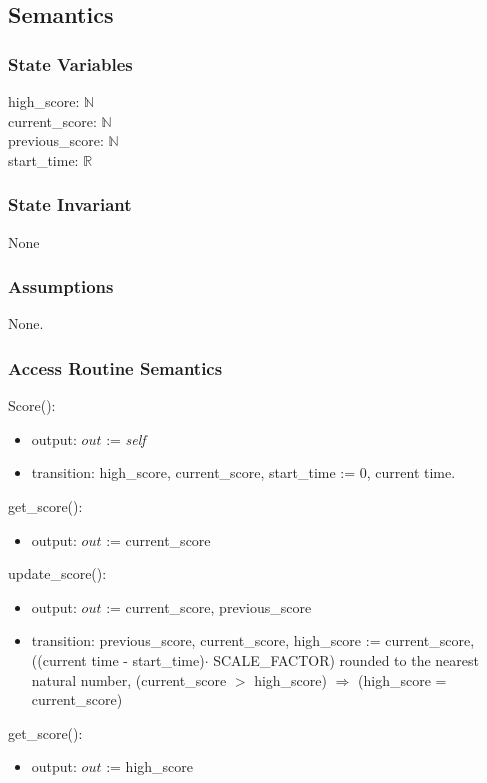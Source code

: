 \documentclass[12pt]{article}
\begin{document}
\subsection* {Semantics}

\subsubsection* {State Variables}

high\_score: $\mathbb{N}$ \\
current\_score: $\mathbb{N}$ \\
previous\_score: $\mathbb{N}$ \\
start\_time: $\mathbb{R}$

\subsubsection* {State Invariant}

None

\subsubsection* {Assumptions}

None.

\subsubsection* {Access Routine Semantics}

Score():
\begin{itemize}
    \item output: $out$ := \textit{self} 
    \item transition: high\_score, current\_score, start\_time := 0, current time.
\end{itemize}
\noindent get\_score():
\begin{itemize}
    \item output: $out$ := current\_score
\end{itemize}
\noindent update\_score():
\begin{itemize}
    \item output: $out$ := current\_score, previous\_score
    \item transition: previous\_score, current\_score, high\_score := current\_score, ((current time - start\_time)$\cdot$ SCALE\_FACTOR) rounded to the nearest natural number, (current\_score $>$ high\_score) $\Rightarrow$ (high\_score = current\_score)
\end{itemize}
\noindent get\_score():
\begin{itemize}
    \item output: $out$ := high\_score
\end{itemize}
\end{document}
